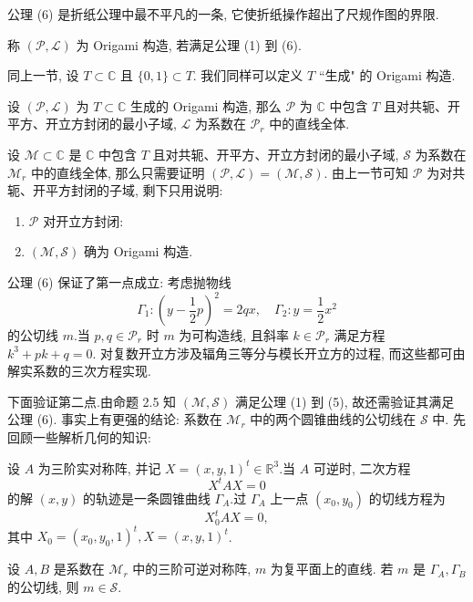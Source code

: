 公理 (6) 是折纸公理中最不平凡的一条, 它使折纸操作超出了尺规作图的界限.

\begin{definition}
    称 $(\mathcal{P},\mathcal{L})$ 为 Origami 构造, 若满足公理 (1) 到 (6).
\end{definition}

同上一节, 设 $T\subset\mathbb{C}$ 且 $\{0,1\}\subset T$.
我们同样可以定义 $T$ ``生成" 的 Origami 构造.

\begin{theorem}
    设 $(\mathcal{P},\mathcal{L})$ 为 $T\subset\mathbb{C}$ 生成的 Origami 构造, 
    那么 $\mathcal{P}$ 为 $\mathbb{C}$ 中包含 $T$ 且对共轭、开平方、开立方封闭的最小子域, 
    $\mathcal{L}$ 为系数在 $\mathcal{P}_r$ 中的直线全体.
\end{theorem}

设 $\mathcal{M}\subset\mathbb{C}$ 是 $\mathbb{C}$ 中包含 $T$ 且对共轭、开平方、开立方封闭的最小子域, 
$\mathcal{S}$ 为系数在 $\mathcal{M}_r$ 中的直线全体, 
那么只需要证明 $(\mathcal{P},\mathcal{L})=(\mathcal{M},\mathcal{S})$.
由上一节可知 $\mathcal{P}$ 为对共轭、开平方封闭的子域, 剩下只用说明: 

\begin{enumerate}[wide,itemindent=2em,label=\bullet]
    \item $\mathcal{P}$ 对开立方封闭:
    \item $(\mathcal{M},\mathcal{S})$ 确为 Origami 构造.
\end{enumerate}

公理 (6) 保证了第一点成立: 考虑抛物线
$$
\Gamma_1:(y-\frac{1}{2}p)^2=2qx,\quad \Gamma_2:y=\frac{1}{2}x^2
$$
的公切线 $m$.当 $p,q\in\mathcal{P}_r$ 时 $m$ 为可构造线, 
且斜率 $k\in\mathcal{P}_r$ 满足方程 $k^3+pk+q=0$.
对复数开立方涉及辐角三等分与模长开立方的过程, 而这些都可由解实系数的三次方程实现.

下面验证第二点.由命题 2.5 知 $(\mathcal{M},\mathcal{S})$ 满足公理 (1) 到 (5), 
故还需验证其满足公理 (6).
事实上有更强的结论: 系数在 $\mathcal{M}_r$ 中的两个圆锥曲线的公切线在 $\mathcal{S}$ 中. 
先回顾一些解析几何的知识: 

设 $A$ 为三阶实对称阵, 
并记 $X=(x,y,1)^t\in\mathbb{R}^3$.当 $A$ 可逆时, 二次方程
$$
X^tAX=0
$$
的解 $(x,y)$ 的轨迹是一条圆锥曲线 $\Gamma_A$.过 $\Gamma_A$ 上一点 $(x_0,y_0)$ 的切线方程为
$$
X_0^tAX=0,
$$
其中 $X_0=(x_0,y_0,1)^t,X=(x,y,1)^t$.

\begin{proposition}
    设 $A,B$ 是系数在 $\mathcal{M}_r$ 中的三阶可逆对称阵, 
    $m$ 为复平面上的直线.
    若 $m$ 是 $\Gamma_A,\Gamma_B$ 的公切线, 则 $m\in\mathcal{S}$.
\end{proposition}

